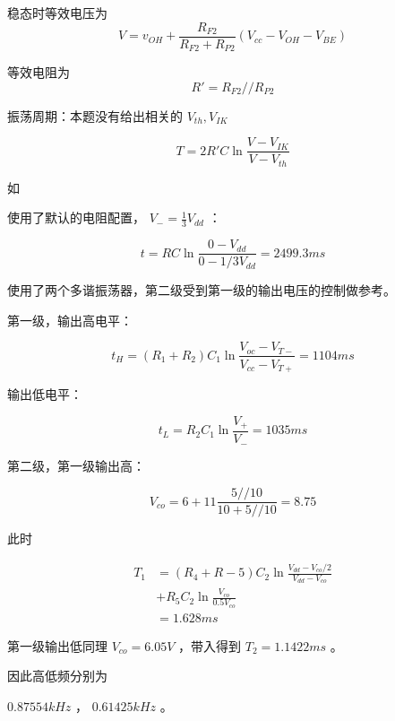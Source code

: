 \documentclass[lang=cn,11pt,a4paper,cite=authoryear,twocolumn]{elegantpaper}
\begin{document}

稳态时等效电压为 \[V = v_{OH} + \frac{R_{F2}}{R_{F2} + R_{P2}}(V_{cc} - V_{OH} - V_{BE})\] 

等效电阻为 \[R' = R_{F2} // R_{P2}\]

振荡周期：本题没有给出相关的 \(V_{th}, V_{IK}\)

\[T = 2 R' C \ln \frac{V - V_{IK}}{V - V_{th}}\] 


如 



使用了默认的电阻配置， \(V_- = \frac{1}{3}V_{dd}\) ：

\[t = RC \ln \frac{0-V_{dd}}{0-1/3 V_{dd}} = 2499.3 ms\]


使用了两个多谐振荡器，第二级受到第一级的输出电压的控制做参考。

第一级，输出高电平：

\[t_H = (R_1 + R_2) C_1 \ln \frac{V_{oc} - V_{T-}}{V_{cc} - V_{T+}} = 1104 ms\]

输出低电平：

\[t_L = R_2 C_1 \ln \frac{V_+}{V_-} = 1035 ms\]

第二级，第一级输出高： 

\[V_{co} = 6 + 11 \frac{5 // 10}{10 + 5 // 10} = 8.75\]

此时 

\[\begin{aligned}
    T_1 &= (R_4 + R-5) C_2 \ln \frac{V_{dd} - V_{co} / 2}{V_{dd} - V_{co}} \\ 
    & + R_5 C_2 \ln \frac{V_{co}}{0.5 V_{co}}\\ 
    &= 1.628 ms 
\end{aligned}\]

第一级输出低同理 \(V_{co} = 6.05 V\) ，带入得到 \(T_2 = 1.1422 ms\) 。

因此高低频分别为

\(0.87554 kHz \text{ ， }0.61425 kHz\) 。



\end{document}
